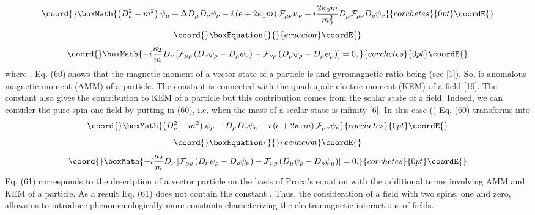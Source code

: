 \documentclass[a4paper,12pt]{article}
\begin{document}
\[\coord{}\boxMath{
\left(D^2_\nu -m^2\right)\psi_{\mu}+\Delta D_\mu D_\nu \psi_\nu
-i\left(e+2\kappa_1m\right)\mathcal{F}_{\mu\nu}\psi_\nu+
i\frac{2\kappa_0 m}{m_0^2}D_\mu
\mathcal{F}_{\rho\nu}D_\rho\psi_\nu
}{corchetes}{0pt}\coordE{}\]
\vspace{-8mm}
\begin{equation}\coord{}\boxEquation{
\label{60}
}{
}{ecuacion}\coordE{}\end{equation}
\vspace{-8mm}
\[\coord{}\boxMath{
-i\frac{\kappa_2}{m}D_\nu\left[\mathcal{F}_{\mu\rho}\left(D_\nu\psi_\rho-
D_\rho\psi_\nu\right)-\mathcal{F}_{\nu\rho}\left(D_\mu\psi_\rho-D_\rho
\psi_\mu\right)\right]=0,
}{corchetes}{0pt}\coordE{}\]
where \coordHE{}. Eq. (60) shows that the magnetic
moment of a vector state of a particle is \coordHE{} and
gyromagnetic ratio being \coordHE{} (see [1]). So,
\coordHE{} is anomalous magnetic moment (AMM) of a particle. The
constant \coordHE{} is connected with the quadrupole electric
moment (KEM) of a field [19]. The constant \coordHE{} also gives
the contribution to KEM of a particle but this contribution comes
from the scalar state of a field. Indeed, we can consider the pure
spin-one field by putting \coordHE{} in (60), i.e.
when the mass of a scalar state is infinity [6]. In this case
(\coordHE{}) Eq. (60) transforms into
\[\coord{}\boxMath{
\left(D^2_\nu -m^2\right)\psi_{\mu}-D_\mu D_\nu \psi_\nu
-i\left(e+2\kappa_1m\right)\mathcal{F}_{\mu\nu}\psi_\nu
}{corchetes}{0pt}\coordE{}\]
\vspace{-8mm}
\begin{equation}\coord{}\boxEquation{
\label{61}
}{
}{ecuacion}\coordE{}\end{equation}
\vspace{-8mm}
\[\coord{}\boxMath{
-i\frac{\kappa_2}{m}D_\nu\left[\mathcal{F}_{\mu\rho}\left(D_\nu\psi_\rho-
D_\rho\psi_\nu\right)-\mathcal{F}_{\nu\rho}\left(D_\mu\psi_\rho-
D_\rho\psi_\mu\right)\right]=0.
}{corchetes}{0pt}\coordE{}\]
Eq. (61) corresponds to the description of a vector particle on
the basis of Proca's equation with the additional terms involving
AMM and KEM of a particle. As a result Eq. (61) does not contain
the constant \coordHE{}. Thus, the consideration of a field with
two spins, one and zero, allows us to introduce phenomenologically
more constants characterizing the electromagnetic interactions of
fields.
\end{document}
